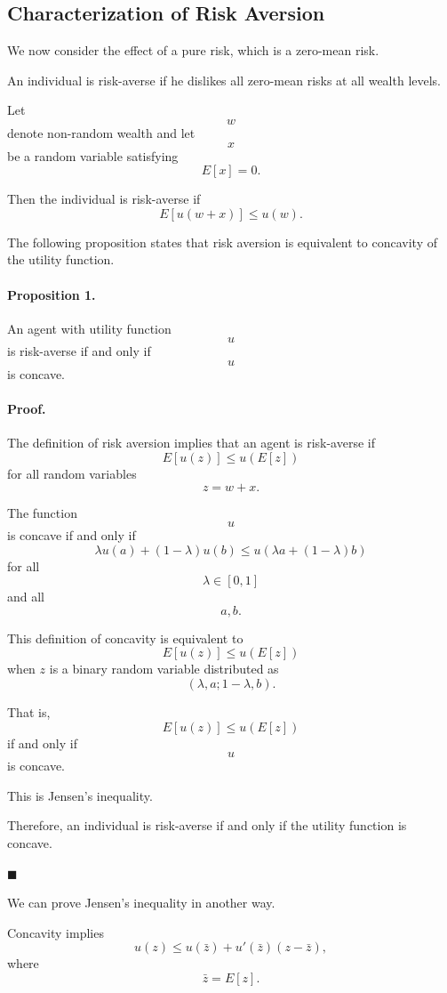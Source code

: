 \subsection{Characterization of Risk Aversion}

We now consider the effect of a pure risk, which is a zero-mean risk.

An individual is risk-averse if he dislikes all zero-mean risks at all wealth levels.

Let
\[
w
\]
denote non-random wealth and let
\[
x
\]
be a random variable satisfying
\[
E[x]=0.
\]

Then the individual is risk-averse if
\[
E[u(w+x)]
\le
u(w).
\]

The following proposition states that risk aversion is equivalent to concavity of the utility function.

\paragraph{Proposition 1.}

An agent with utility function
\[
u
\]
is risk-averse if and only if
\[
u
\]
is concave.



\paragraph{Proof.}

The definition of risk aversion implies that an agent is risk-averse if
\[
E[u(z)]
\le
u(E[z])
\]
for all random variables
\[
z=w+x.
\]

The function
\[
u
\]
is concave if and only if
\[
\lambda u(a)+(1-\lambda)u(b)
\le
u(\lambda a+(1-\lambda)b)
\]
for all
\[
\lambda\in[0,1]
\]
and all
\[
a,b.
\]

This definition of concavity is equivalent to
\[
E[u(z)]
\le
u(E[z])
\]
when \(z\) is a binary random variable distributed as
\[
(\lambda,a;1-\lambda,b).
\]

That is,
\[
E[u(z)]
\le
u(E[z])
\]
if and only if
\[
u
\]
is concave.

This is Jensen's inequality.

Therefore, an individual is risk-averse if and only if the utility function is concave.

\hfill\(\blacksquare\)

\medskip

We can prove Jensen's inequality in another way.

Concavity implies
\[
u(z)
\le
u(\bar z)
+
u'(\bar z)(z-\bar z),
\]
where
\[
\bar z=E[z].
\]

